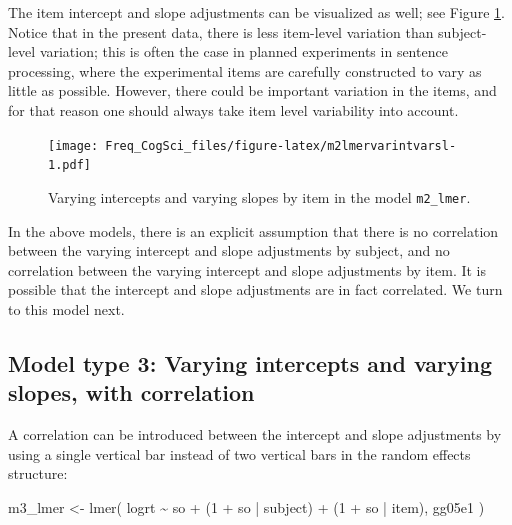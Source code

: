 \documentclass[
  12pt,
]{krantz}
\newenvironment{Shaded}{\begin{snugshade}}{\end{snugshade}}
\newcommand{\DecValTok}[1]{\textcolor[rgb]{0.00,0.00,0.81}{#1}}
\newcommand{\FunctionTok}[1]{\textcolor[rgb]{0.00,0.00,0.00}{#1}}
\newcommand{\NormalTok}[1]{#1}
\newcommand{\OtherTok}[1]{\textcolor[rgb]{0.56,0.35,0.01}{#1}}
\newcommand{\SpecialCharTok}[1]{\textcolor[rgb]{0.00,0.00,0.00}{#1}}
\theoremstyle{definition}
\theoremstyle{definition}
\theoremstyle{definition}
\theoremstyle{definition}
\theoremstyle{remark}
\begin{document}
The item intercept and slope adjustments can be visualized as well; see Figure \ref{fig:m2lmervarintvarsl}. Notice that in the present data, there is less item-level variation than subject-level variation; this is often the case in planned experiments in sentence processing, where the experimental items are carefully constructed to vary as little as possible. However, there could be important variation in the items, and for that reason one should always take item level variability into account.

\begin{figure}
\centering
\texttt{[image: Freq\_CogSci\_files/figure-latex/m2lmervarintvarsl-1.pdf]}
\caption{\label{fig:m2lmervarintvarsl}Varying intercepts and varying slopes by item in the model \texttt{m2\_lmer}.}
\end{figure}

In the above models, there is an explicit assumption that there is no correlation between the varying intercept and slope adjustments by subject, and no correlation between the varying intercept and slope adjustments by item. It is possible that the intercept and slope adjustments are in fact correlated. We turn to this model next.

\hypertarget{model-type-3-varying-intercepts-and-varying-slopes-with-correlation}{%
\subsection{Model type 3: Varying intercepts and varying slopes, with correlation}\label{model-type-3-varying-intercepts-and-varying-slopes-with-correlation}}

A correlation can be introduced between the intercept and slope adjustments by using a single vertical bar instead of two vertical bars in the random effects structure:

\begin{Shaded}
\begin{Highlighting}[]
\NormalTok{m3\_lmer }\OtherTok{\textless{}{-}} \FunctionTok{lmer}\NormalTok{(}
\NormalTok{  logrt }\SpecialCharTok{\textasciitilde{}}\NormalTok{ so }\SpecialCharTok{+}\NormalTok{ (}\DecValTok{1} \SpecialCharTok{+}\NormalTok{ so }\SpecialCharTok{|}\NormalTok{ subject) }\SpecialCharTok{+}\NormalTok{ (}\DecValTok{1} \SpecialCharTok{+}\NormalTok{ so }\SpecialCharTok{|}\NormalTok{ item),}
\NormalTok{  gg05e1}
\NormalTok{)}
\end{Highlighting}
\end{Shaded}
\end{document}
